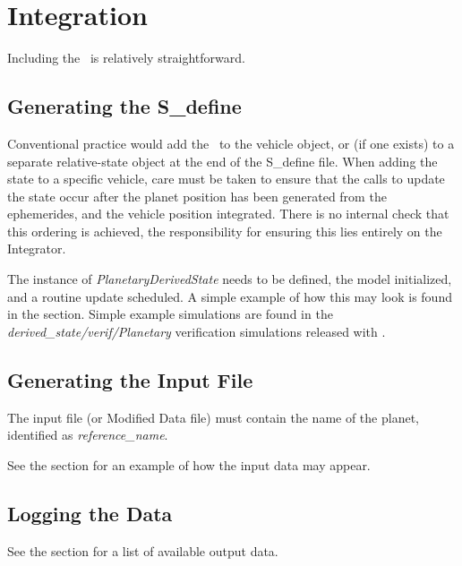 %
%
% 
%

 \section{Integration}

Including the \PlanetaryDesc\ is relatively straightforward.

 \subsection{Generating the S\_define}

Conventional practice would add the \PlanetaryDesc\ to the vehicle object, or (if one exists) to a separate relative-state object at the end of the S\_define file.  When adding the state to a specific vehicle, care must be taken to ensure that the calls to update the state occur after the planet position has been generated from the ephemerides, and the vehicle position integrated.  There is no internal check that this ordering is achieved, the responsibility for ensuring this lies entirely on the Integrator.

The instance of \textit{PlanetaryDerivedState} needs to be defined, the model initialized, and a routine update scheduled.  A simple example of how this may look is found in the  section.  Simple example simulations are found in the 
\textit{derived\_state/verif/Planetary} verification simulations released with \JEODid.

\subsection{Generating the Input File}
The input file (or Modified Data file) must contain the name of the planet, identified as \textit{reference\_name}.

See the  section for an example of how the input data may appear.

\subsection{Logging the Data}
See the  section for a list of available output data.
